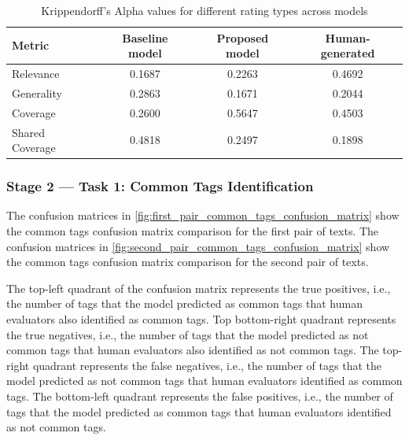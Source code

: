 \begin{table}[htbp]
    \centering
    \begin{tabular}{lccc}
        \hline
        \textbf{Metric} & \textbf{Baseline model} & \textbf{Proposed model} & \textbf{Human-generated} \\
        \hline
        Relevance       & 0.1687            & 0.2263                  & 0.4692                   \\
        Generality      & 0.2863            & 0.1671                  & 0.2044                   \\
        Coverage        & 0.2600            & 0.5647                  & 0.4503                   \\
        Shared Coverage & 0.4818            & 0.2497                  & 0.1898                   \\
        \hline
    \end{tabular}
    \caption{Krippendorff's Alpha values for different rating types across models}
    \label{tab:kalpha}
\end{table}

\subsubsection{Stage 2 — Task 1: Common Tags Identification}
The confusion matrices in \cref{fig:first_pair_common_tags_confusion_matrix} show the common tags confusion matrix comparison for the first pair of texts. The confusion matrices in \cref{fig:second_pair_common_tags_confusion_matrix} show the common tags confusion matrix comparison for the second pair of texts.

The top-left quadrant of the confusion matrix represents the true positives, i.e., the number of tags that the model predicted as common tags that human evaluators also identified as common tags. Top bottom-right quadrant represents the true negatives, i.e., the number of tags that the model predicted as not common tags that human evaluators also identified as not common tags. The top-right quadrant represents the false negatives, i.e., the number of tags that the model predicted as not common tags that human evaluators identified as common tags. The bottom-left quadrant represents the false positives, i.e., the number of tags that the model predicted as common tags that human evaluators identified as not common tags.

